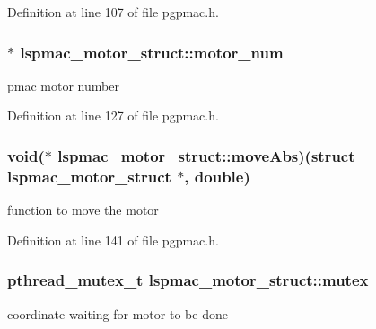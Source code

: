 Definition at line 107 of file pgpmac.\-h.

\hypertarget{structlspmac__motor__struct_ad6a51cca3c7e5f79168e5c33fd9e736b}{
\subsubsection[{motor\-\_\-num}]{$\ast$ lspmac\-\_\-motor\-\_\-struct\-::motor\-\_\-num}}\label{structlspmac__motor__struct_ad6a51cca3c7e5f79168e5c33fd9e736b}


pmac motor number 



Definition at line 127 of file pgpmac.\-h.

\hypertarget{structlspmac__motor__struct_a20db3de86854b627815b3d940555ea75}{
\subsubsection[{move\-Abs}]{\setlength{\rightskip}{0pt plus 5cm}void($\ast$ lspmac\-\_\-motor\-\_\-struct\-::move\-Abs)(struct {\bf lspmac\-\_\-motor\-\_\-struct} $\ast$, double)}}\label{structlspmac__motor__struct_a20db3de86854b627815b3d940555ea75}


function to move the motor 



Definition at line 141 of file pgpmac.\-h.

\hypertarget{structlspmac__motor__struct_a188c5b1e991750ce2ffd53e0192e0907}{
\subsubsection[{mutex}]{\setlength{\rightskip}{0pt plus 5cm}pthread\-\_\-mutex\-\_\-t lspmac\-\_\-motor\-\_\-struct\-::mutex}}\label{structlspmac__motor__struct_a188c5b1e991750ce2ffd53e0192e0907}


coordinate waiting for motor to be done 



